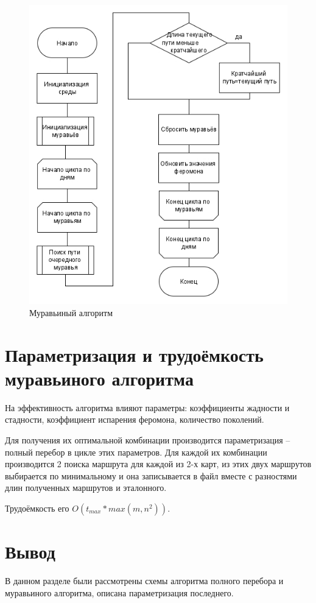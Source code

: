 \begin{figure}[H]
	\centering
	\includegraphics[width=0.7\linewidth]{src/ant}
	\caption{Муравьиный алгоритм}
	\label{fig:ant}
\end{figure}

\section{Параметризация и трудоёмкость муравьиного алгоритма}
На эффективность алгоритма влияют параметры: коэффициенты жадности и стадности, коэффициент испарения феромона, количество поколений. 
\par Для получения их оптимальной комбинации производится параметризация -- полный перебор в цикле этих параметров. Для каждой их комбинации производится 2 поиска маршрута для каждой из 2-х карт, из этих двух маршрутов выбирается по минимальному и она  записывается в файл вместе с разностями длин полученных маршрутов и эталонного.
\par Трудоёмкость его $O(t_{max}*max(m,n^2))$.

\section{Вывод}
В данном разделе были рассмотрены схемы алгоритма полного перебора и муравьиного алгоритма, описана параметризация последнего.